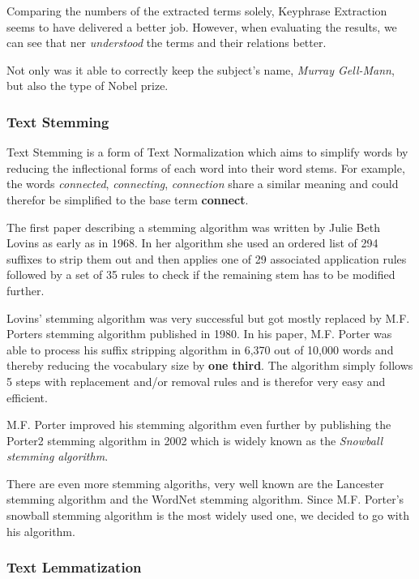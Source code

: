 Comparing the numbers of the extracted terms solely, Keyphrase Extraction seems to have delivered a better job.
However, when evaluating the results, we can see that \Gls{ner} \textit{understood} the terms and their
relations better.

Not only was it able to correctly keep the subject's name, \textit{Murray Gell-Mann}, but also the type of Nobel prize.


\subsubsection{Text Stemming}
\label{subsubsec:3_text_stemming}

Text Stemming is a form of Text Normalization which aims to simplify words
by reducing the inflectional forms of each word into their word stems.
For example, the words \textit{connected}, \textit{connecting}, \textit{connection} share a similar meaning and could
therefor be simplified to the base term \textbf{connect}.

The first paper describing a stemming algorithm was written by Julie Beth Lovins\cite{LovinsStemmer}
as early as in 1968.
In her algorithm she used an ordered list of 294 suffixes to strip them out and then applies one of
29 associated application rules followed by a set of 35 rules to check if the remaining stem has to be
modified further.

Lovins' stemming algorithm was very successful but got mostly replaced by
M.F. Porters stemming algorithm\cite{PorterStemmerAlgorithm} published in 1980.
In his paper, M.F. Porter was able to process his suffix stripping algorithm in 6,370 out of 10,000 words and thereby
reducing the vocabulary size by \textbf{one third}.
The algorithm simply follows 5 steps with replacement and/or removal rules and is therefor very easy and efficient.

M.F. Porter improved his stemming algorithm even further
by publishing the Porter2 stemming algorithm\cite{SnowballStemmerAlgorithm} in 2002
which is widely known as the \textit{Snowball stemming algorithm}.

There are even more stemming algoriths, very well known are the Lancester stemming algorithm\cite{LancesterStemmer}
and the WordNet stemming algorithm\cite{WordNetStemmer}.
Since M.F. Porter's snowball stemming algorithm is the most widely used one, we decided to go with his algorithm.

\subsubsection{Text Lemmatization}
\label{subsubsec:3_text_lemmatization}

